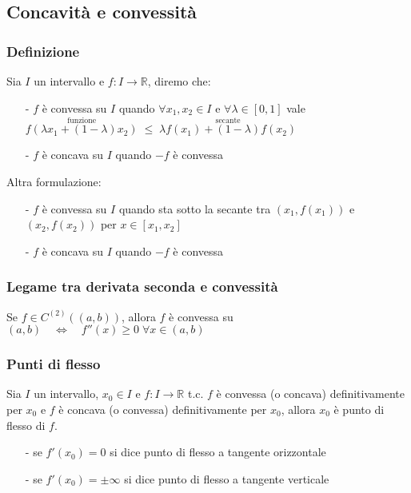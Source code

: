 \documentclass[a4paper]{article}
\newcommand\cont[2]{C^{(#1)} \left({#2}\right)}
\begin{document}
\subsection{Concavità e convessità}
\subsubsection*{Definizione}
Sia \(I\) un intervallo e \(f:I \to \mathbb{R}\), diremo che:
\begin{itemize} [topsep=3pt, itemsep=0pt]
	\item[-] \(f\) è convessa su \(I\) quando \(\forall x_1, x_2 \in I\) e \(\forall \lambda \in \left[0, 1\right]\) vale
	\(\stackrel{\text{funzione}}{f(\lambda x_1 + \left(1-\lambda\right) x_2)} \; \leq \; \stackrel{\text{secante}}{\lambda f(x_1) + \left(1-\lambda\right)f(x_2)}\)
	\item[-] \(f\) è concava su \(I\) quando \(-f\) è convessa
\end{itemize}
Altra formulazione:
\begin{itemize} [topsep=3pt, itemsep=0pt]
	\item[-] \(f\) è convessa su \(I\) quando sta sotto la secante tra \(\left(x_1, f(x_1)\right)\) e \(\left(x_2, f(x_2)\right)\) per \(x \in \left[x_1, x_2\right]\)
	\item[-] \(f\) è concava su \(I\) quando \(-f\) è convessa
\end{itemize}

\subsubsection*{Legame tra derivata seconda e convessità}
Se \(f \in \cont{2}{\left(a, b\right)}\), allora \(f\) è convessa su \(\left(a, b\right) \quad \Leftrightarrow \quad f''(x) \geq 0 \; \forall x \in \left(a, b\right)\)

\subsubsection*{Punti di flesso}
Sia \(I\) un intervallo, \(x_0 \in I\) e \(f:I \to \mathbb{R}\) t.c. \(f\) è convessa (o concava) definitivamente per \(x_0\)
e \(f\) è concava (o convessa) definitivamente per \(x_0\), allora \(x_0\) è punto di flesso di \(f\).
\begin{itemize}
	\item[-] se \(f'(x_0) = 0\) si dice punto di flesso a tangente orizzontale
	\item[-] se \(f'(x_0) = \pm \infty\) si dice punto di flesso a tangente verticale
\end{itemize}
\end{document}
